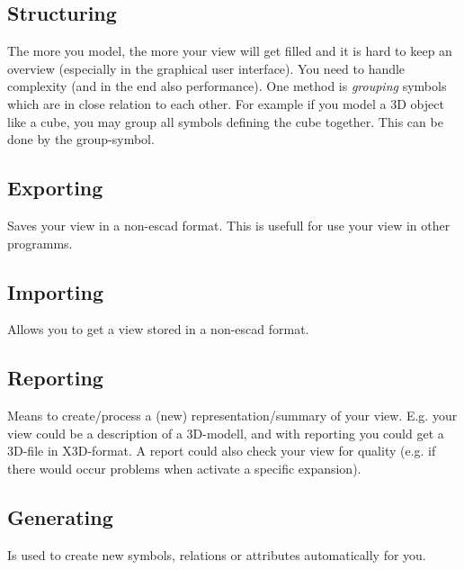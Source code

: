 \documentclass[a4paper, 12pt, openany]{scrbook}
\begin{document}
\subsection{Structuring}
The more you model, the more your view will get filled and it is hard to keep an overview (especially in the graphical user interface). You need to handle complexity (and in the end also performance). One method is \emph{grouping} symbols which are in close relation to each other. For example if you model a 3D object like a cube, you may group all symbols defining the cube together. This can be done by the group-symbol.
\subsection{Exporting}
Saves your view in a non-escad format. This is usefull for use your view in other programms.
\subsection{Importing}
Allows you to get a view stored in a non-escad format.
\subsection{Reporting}
Means to create/process a (new) representation/summary of your view. E.g. your view could be a description of a 3D-modell, and with reporting you could get a 3D-file in X3D-format. A report could also check your view for quality (e.g. if there would occur problems when activate a specific expansion).
\subsection{Generating}
Is used to create new symbols, relations or attributes automatically for you. 
\end{document}
